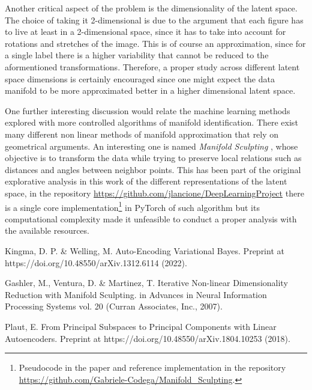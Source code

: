 \documentclass[twocolumn,gsifonts,twoside]{gsipaper}
\begin{document}
Another critical aspect of the problem is the dimensionality of the latent space. The choice of taking it 2-dimensional is due to the argument that each figure has to live at least in a 2-dimensional space, since it has to take into account for rotations and stretches of the image. This is of course an approximation, since for a single label there is a higher variability that cannot be reduced to the aformentioned transformations. Therefore, a proper study across different latent space dimensions is certainly encouraged since one might expect the data manifold to be more approximated better in a higher dimensional latent space.

One further interesting discussion would relate the machine learning methods explored with more controlled algorithms of manifold identification. There exist many different non linear methods of manifold approximation that rely on geometrical arguments. An interesting one is named \emph{Manifold Sculpting} \cite{Gashler2007}
, whose objective is to transform the data while trying to preserve local relations such as distances and angles between neighbor points. This has been part of the original explorative analysis in this work of the different representations of the latent space, in the repository \url{https://github.com/jlancione/DeepLearningProject}
there is a single core implementation\footnote{Pseudocode in the paper \cite{Gashler2007} and reference implementation in the repository \url{https://github.com/Gabriele-Codega/Manifold_Sculpting}.
} in PyTorch of such algorithm but its computational complexity made it unfeasible to conduct a proper analysis with the available resources. 



%  

\begin{thebibliography}{99}
  Kingma, D. P. \& Welling, M. Auto-Encoding Variational Bayes. Preprint at https://doi.org/10.48550/arXiv.1312.6114 (2022).

  Gashler, M., Ventura, D. \& Martinez, T. Iterative Non-linear Dimensionality Reduction with Manifold Sculpting. in Advances in Neural Information Processing Systems vol. 20 (Curran Associates, Inc., 2007).

  Plaut, E. From Principal Subspaces to Principal Components with Linear Autoencoders. Preprint at https://doi.org/10.48550/arXiv.1804.10253 (2018).
\end{thebibliography}
\end{document}
